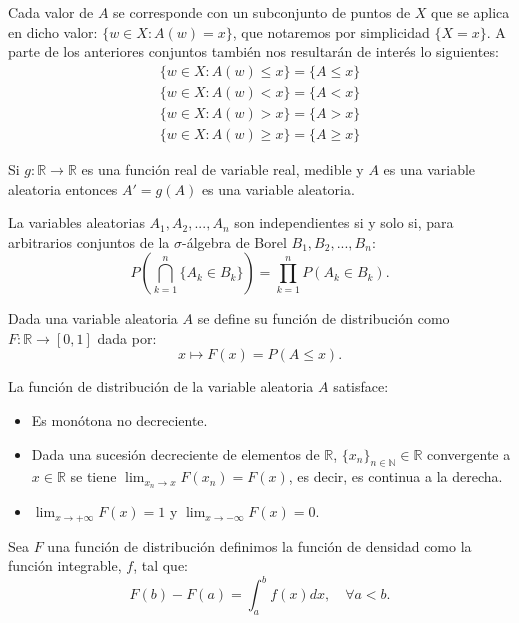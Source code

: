 \documentclass[../proyecto.tex]{memoir}
\begin{document}
Cada valor de $A$ se corresponde con un subconjunto de puntos de $X$ que se aplica en dicho valor: $\{ w\in X : A(w)=x\}$, que notaremos por simplicidad $\{X = x\}$. A parte de los anteriores conjuntos también nos resultarán de interés lo siguientes:
\begin{align*}
\{ w\in X : A(w) \leq x\} = \{ A \leq x \} \\
\{ w\in X : A(w) < x\} = \{ A < x \} \\
\{ w\in X : A(w) > x\} = \{ A > x \} \\
\{ w\in X : A(w) \geq x\} = \{ A \geq x \}
\end{align*}

\begin{prop} \label{funcion_de_va}
Si $g:\mathds{R}\to\mathds{R}$ es una función real de variable real, medible y $A$ es una variable aleatoria entonces $A'=g(A)$ es una variable aleatoria.
\end{prop}

\begin{defi}
La variables aleatorias $A_1, A_2,..., A_n$ son independientes si y solo si, para arbitrarios conjuntos de la $\sigma$-álgebra de Borel $B_1, B_2,..., B_n$: $$
	P \left( \bigcap_{k = 1}^{n} \{A_k \in B_k\} \right) = \prod_{k = 1}^{n} P(A_k \in B_k).
$$
\end{defi}

\begin{defi}
Dada una variable aleatoria $A$ se define su función de distribución como $ F : \mathds{R} \to [0,1] $ dada por:
$$
x \mapsto F(x)=P(A \leq x).
$$
\end{defi}

\begin{prop}
La función de distribución de la variable aleatoria $A$ satisface:
\begin{itemize}
\item Es monótona no decreciente.
\item Dada una sucesión decreciente de elementos de $\mathds{R}$, $\{x_n\}_{n \in \mathds{N}} \in \mathds{R}$ convergente a $x\in \mathds{R}$ se tiene $\lim_{x_n \to x} F(x_n) = F(x)$, es decir, es continua a la derecha.
\item $\lim_{x\to+\infty} F(x) = 1$ y $\lim_{x\to-\infty} F(x) = 0$.
\end{itemize}
\end{prop}

\begin{defi}
Sea $F$ una función de distribución definimos la función de densidad como la función integrable, $f$, tal que:
$$
F(b)-F(a) = \int^{b}_a f(x) dx, \quad \forall a < b. 
$$
\end{defi}
\end{document}
